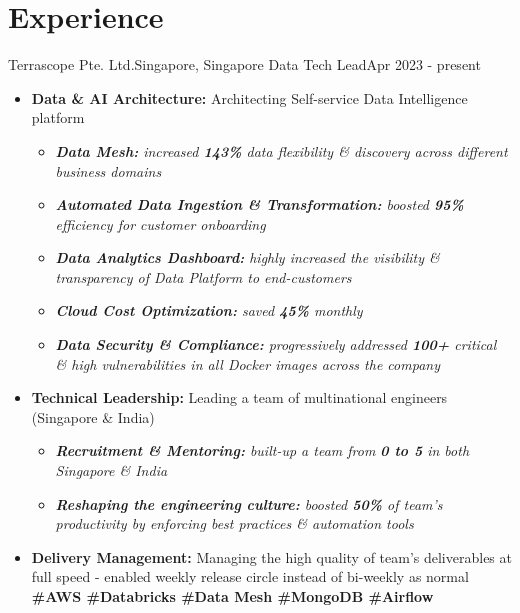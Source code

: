 \def\labelitemi{$\circ$}


\section{Experience}\label{sec:experience}
\resumeSubHeadingListStart

\resumeSubheading
{Terrascope Pte. Ltd.}{Singapore, Singapore}
{Data Tech Lead}{Apr 2023 - present}
\begin{itemize}
    \item \textbf{Data \& AI Architecture:} Architecting Self-service Data Intelligence platform
    \begin{itemize}
        \item{\emph{\textbf{Data Mesh:} increased \textbf{143\%} data flexibility \& discovery across different business domains}}
        \item{\emph{\textbf{Automated Data Ingestion \& Transformation:} boosted \textbf{95\%} efficiency for customer onboarding}}
        \item{\emph{\textbf{Data Analytics Dashboard:} highly increased the visibility \& transparency of Data Platform to end-customers}}
        \item {\emph{\textbf{Cloud Cost Optimization:} saved \textbf{45\%} monthly}}
        \item {\emph{\textbf{Data Security \& Compliance:} progressively addressed \textbf{100+} critical \& high vulnerabilities in all Docker images across the company }}
    \end{itemize}
    \item \textbf{Technical Leadership:} Leading a team of multinational engineers (Singapore \& India)
    \begin{itemize}
        \item{\emph{\textbf{Recruitment \& Mentoring:} built-up a team from \textbf{0 to 5} in both Singapore \& India}}
        \item{\emph{\textbf{Reshaping the engineering culture:} boosted \textbf{50\%} of team's productivity by enforcing best practices \& automation tools}}
    \end{itemize}
    \item \textbf{Delivery Management:} Managing the high quality of team's deliverables at full speed - enabled weekly release circle instead of bi-weekly as normal
    \textbf{\scriptsize{\#AWS \#Databricks \#Data Mesh \#MongoDB \#Airflow}}
\end{itemize}

